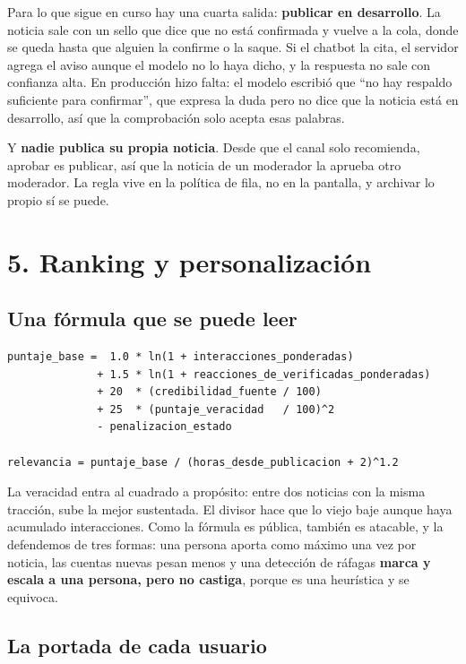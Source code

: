 \documentclass[12pt,a4paper]{article}
\begin{document}
Para lo que sigue en curso hay una cuarta salida: \textbf{publicar en desarrollo}. La noticia sale
con un sello que dice que no está confirmada y vuelve a la cola, donde se queda hasta que alguien la
confirme o la saque. Si el chatbot la cita, el servidor agrega el aviso aunque el modelo no lo haya
dicho, y la respuesta no sale con confianza alta. En producción hizo falta: el modelo escribió que
``no hay respaldo suficiente para confirmar'', que expresa la duda pero no dice que la noticia está
en desarrollo, así que la comprobación solo acepta esas palabras.

Y \textbf{nadie publica su propia noticia}. Desde que el canal solo recomienda, aprobar es publicar,
así que la noticia de un moderador la aprueba otro moderador. La regla vive en la política de fila,
no en la pantalla, y archivar lo propio sí se puede.

\section{5. Ranking y personalización}

\subsection{Una fórmula que se puede leer}

\begin{verbatim}
puntaje_base =  1.0 * ln(1 + interacciones_ponderadas)
              + 1.5 * ln(1 + reacciones_de_verificadas_ponderadas)
              + 20  * (credibilidad_fuente / 100)
              + 25  * (puntaje_veracidad   / 100)^2
              - penalizacion_estado

relevancia = puntaje_base / (horas_desde_publicacion + 2)^1.2
\end{verbatim}

La veracidad entra al cuadrado a propósito: entre dos noticias con la misma tracción, sube la mejor
sustentada. El divisor hace que lo viejo baje aunque haya acumulado interacciones. Como la fórmula
es pública, también es atacable, y la defendemos de tres formas: una persona aporta como máximo una
vez por noticia, las cuentas nuevas pesan menos y una detección de ráfagas \textbf{marca y escala a
una persona, pero no castiga}, porque es una heurística y se equivoca.

\subsection{La portada de cada usuario}
\end{document}
